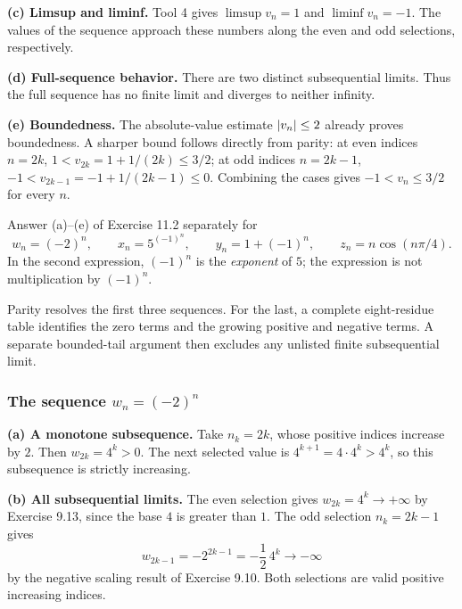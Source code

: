 \textbf{(c) Limsup and liminf.}
Tool 4 gives $\limsup v_n=1$ and $\liminf v_n=-1$.
The values of the sequence approach these numbers along
the even and odd selections, respectively.

\textbf{(d) Full-sequence behavior.}
There are two distinct subsequential limits. Thus the full
sequence has no finite limit and diverges to neither infinity.

\textbf{(e) Boundedness.}
The absolute-value estimate $\left|v_n\right|\leq2$ already proves
boundedness. A sharper bound follows directly from parity:
at even indices $n=2k$,
$1<v_{2k}=1+1/(2k)\leq3/2$; at odd indices $n=2k-1$,
$-1<v_{2k-1}=-1+1/(2k-1)\leq0$.
Combining the cases gives $-1<v_n\leq3/2$ for every $n$.



\goal Answer (a)--(e) of Exercise 11.2 separately for
\[
 w_n=(-2)^n,\qquad x_n=5^{(-1)^n},\qquad
 y_n=1+(-1)^n,\qquad z_n=n\cos(n\pi/4).
\]
In the second expression, $(-1)^n$ is the \emph{exponent}
of $5$; the expression is not multiplication by $(-1)^n$.

\idea Parity resolves the first three sequences. For the last,
a complete eight-residue table identifies the zero terms and
the growing positive and negative terms. A separate bounded-tail
argument then excludes any unlisted finite subsequential limit.

\subsubsection*{The sequence $w_n=(-2)^n$}

\textbf{(a) A monotone subsequence.}
Take $n_k=2k$, whose positive indices increase by $2$.
Then $w_{2k}=4^k>0$. The next selected value is
$4^{k+1}=4\cdot4^k>4^k$, so this subsequence is strictly
increasing.

\textbf{(b) All subsequential limits.}
The even selection gives $w_{2k}=4^k\to+\infty$ by
Exercise 9.13, since the base $4$ is greater than $1$.
The odd selection $n_k=2k-1$ gives
\[
 w_{2k-1}=-2^{2k-1}=-\frac12\,4^k\longrightarrow-\infty
\]
by the negative scaling result of Exercise 9.10.
Both selections are valid positive increasing indices.

